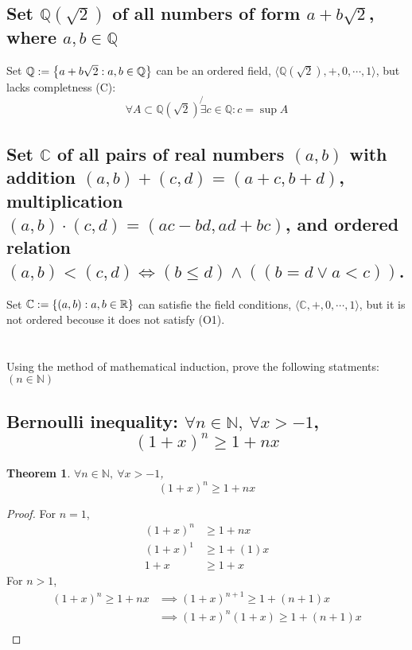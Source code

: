 \documentclass[]{article}
\newcommand{\R}{\mathbb{R}}
\newcommand{\C}{\mathbb{C}}
\newcommand{\N}{\mathbb{N}}
\newcommand{\Q}{\mathbb{Q}}
\newtheorem{theorem}{Theorem}
\begin{document}
\subsection{Set $\Q(\sqrt{2})$ of all numbers of form $a + b\sqrt{2}$, where $a,b\in\Q$}
Set $\Q := \qty{a + b \sqrt{2} : a, b \in \Q}$ can be an ordered field, 
$\langle \Q(\sqrt{2}), +, 0, \cdots, 1\rangle$, but lacks completness (C):
$$\forall A \subset \Q(\sqrt{2}) \not{\exists} c \in \Q : c = \sup A$$

\subsection{Set $\C$ of all pairs of real numbers $(a,b)$ 
    with addition ${(a,b) + (c,d) = (a+c,b+d)}$, 
    multiplication $(a,b)\cdot(c,d) = (ac-bd,ad+bc)$, 
    and ordered relation $(a,b)<(c,d)\iff(b \leq d)\land((b=d \lor a<c))$.
}
Set $\C := \qty{(a,b) : a,b \in \R}$ can satisfie the field conditions, 
$\langle \C, +, 0, \cdots, 1\rangle$,
but it is not ordered becouse it does not satisfy (O1).

\newpage
\section{}
Using the method of mathematical induction, 
prove the following statments: $(n \in \N)$

\subsection{Bernoulli inequality: $\forall n\in\N, \ \forall x > -1$,
$$(1+x)^n \geq 1 + nx$$
}

\begin{theorem}
    $\forall n\in\N, \ \forall x > -1$, $$(1+x)^n \geq 1 + nx$$
\end{theorem}

\begin{proof}
    For $n=1$,
    \begin{align*}
        (1+x)^n &\geq 1 + nx\\
        (1+x)^1 &\geq 1 + (1)x\\
        1+x &\geq 1 + x
    \end{align*}
    For $n > 1$,
    \begin{align*}
        (1+x)^n \geq 1 + nx 
            &\implies (1+x)^{n+1} \geq 1 + (n+1)x\\
            &\implies (1+x)^n (1+x) \geq 1 + (n+1)x\\
    \end{align*}
\end{proof}
\end{document}
